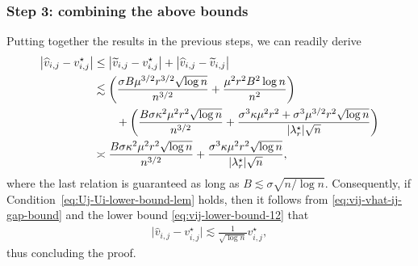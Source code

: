 \subsubsection{Step 3: combining the above bounds} 

Putting together the results in the previous steps, we can readily derive
%
\begin{align}
\big|\widehat{v}_{i,j}-v_{i,j}^{\star}\big| & \leq\big|\widetilde{v}_{i,j}-v_{i,j}^{\star}\big|+ \big| \widehat{v}_{i,j} - \widetilde{v}_{i,j} \big|  \notag\\
 & \lesssim\left(\frac{\sigma B\mu^{3/2}r^{3/2}\sqrt{\log n}}{n^{3/2}}+\frac{\mu^{2}r^{2}B^{2}\log n}{n^{2}}\right) \notag\\
 & \qquad+\left(\frac{B\sigma\kappa^{2}\mu^{2}r^{2}\sqrt{\log n}}{n^{3/2}}+\frac{\sigma^{3}\kappa\mu^{2}r^{2}+\sigma^{3}\mu^{3/2}r^{2}\sqrt{\log n}}{|\lambda_{r}^{\star}|\sqrt{n}}\right) \notag\\
	& \asymp \frac{B\sigma\kappa^{2}\mu^{2}r^{2}\sqrt{\log n}}{n^{3/2}}+\frac{\sigma^{3}\kappa\mu^{2}r^{2}\sqrt{\log n}}{|\lambda_{r}^{\star}|\sqrt{n}},  \label{eq:vij-vhat-ij-gap-bound}
\end{align}
%
where the last relation is guaranteed as long as $B\lesssim \sigma \sqrt{n/\log n}$. 
Consequently, if Condition~\eqref{eq:Uj-Ui-lower-bound-lem} holds, 
then it follows from \eqref{eq:vij-vhat-ij-gap-bound} and the lower bound \eqref{eq:vij-lower-bound-12} that
%
\begin{align*}
	\big|\widehat{v}_{i,j}-v_{i,j}^{\star}\big| \lesssim \frac{1}{\sqrt{\log n}} v_{i,j}^{\star}, 
\end{align*}
%
thus concluding the proof. 






